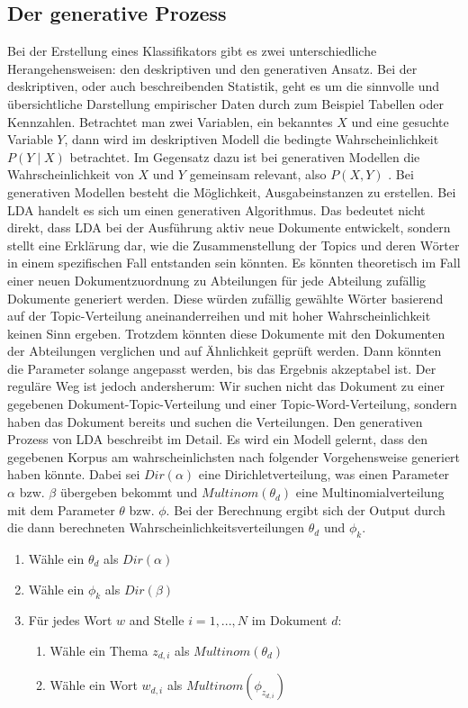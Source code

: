 \documentclass[german,version-2020-11]{uzl-thesis}
\begin{document}
\subsection{Der generative Prozess} 
Bei der Erstellung eines Klassifikators gibt es zwei unterschiedliche Herangehensweisen: den deskriptiven und den generativen Ansatz. Bei der deskriptiven, oder auch beschreibenden Statistik, geht es um die sinnvolle und übersichtliche Darstellung empirischer Daten durch zum Beispiel Tabellen oder Kennzahlen. Betrachtet man zwei Variablen, ein bekanntes $X$ und eine gesuchte Variable $Y$, dann wird im deskriptiven Modell die bedingte Wahrscheinlichkeit $P(Y \mid X)$ betrachtet. Im Gegensatz dazu ist bei generativen Modellen die Wahrscheinlichkeit von $X$ und $Y$ gemeinsam relevant, also $P(X, Y)$ . Bei generativen Modellen besteht die Möglichkeit, Ausgabeinstanzen zu erstellen. Bei LDA handelt es sich um einen generativen Algorithmus. Das bedeutet nicht direkt, dass LDA bei der Ausführung aktiv neue Dokumente entwickelt, sondern stellt eine Erklärung dar, wie die Zusammenstellung der Topics und deren Wörter in einem spezifischen Fall entstanden sein könnten. Es könnten theoretisch im Fall einer neuen Dokumentzuordnung zu Abteilungen für jede Abteilung zufällig Dokumente generiert werden. Diese würden zufällig gewählte Wörter basierend auf der Topic-Verteilung aneinanderreihen und mit hoher Wahrscheinlichkeit keinen Sinn ergeben. Trotzdem könnten diese Dokumente mit den Dokumenten der Abteilungen verglichen und auf Ähnlichkeit geprüft werden. Dann könnten die Parameter solange angepasst werden, bis das Ergebnis akzeptabel ist. Der reguläre Weg ist jedoch andersherum: Wir suchen nicht das Dokument zu einer gegebenen Dokument-Topic-Verteilung und einer Topic-Word-Verteilung, sondern haben das Dokument bereits und suchen die Verteilungen. Den generativen Prozess von LDA beschreibt \cite{t5} im Detail. Es wird ein Modell gelernt, dass den gegebenen Korpus am wahrscheinlichsten nach folgender Vorgehensweise generiert haben könnte. Dabei sei $Dir(\alpha)$ eine Dirichletverteilung, was einen Parameter $\alpha$ bzw. $\beta$ übergeben bekommt und $Multinom(\theta_d)$ eine Multinomialverteilung mit dem Parameter $\theta$ bzw. $\phi$. Bei der Berechnung ergibt sich der Output durch die dann berechneten Wahrscheinlichkeitsverteilungen $\theta_d$ und $\phi_k$.

\begin{enumerate}
	\item Wähle ein $\theta_d$ als $Dir(\alpha)$
	\item Wähle ein $\phi_k$ als $Dir(\beta)$
	\item Für jedes Wort $w$ and Stelle $i = 1,...,N$ im Dokument $d$: 
	\begin{enumerate}
		\item Wähle ein Thema $z_{d,i}$ als $Multinom(\theta_d)$
		\item Wähle ein Wort $w_{d,i}$ als $Multinom(\phi_{z_{d,i}})$
	\end{enumerate}
\end{enumerate}
\end{document}
